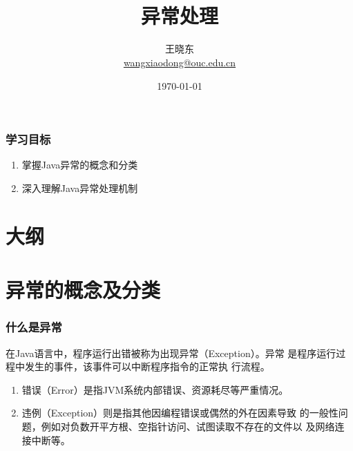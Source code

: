 
\title[KevinW@OUC]{\\  
  异常处理}
\author[王晓东]{王晓东\\
  \href{mailto:wangxiaodong@ouc.edu.cn}{\footnotesize wangxiaodong@ouc.edu.cn}}
\date{\today}


\frame{\titlepage}
\begin{frame}
  \frametitle{学习目标}
  \begin{enumerate}
  \item 掌握Java异常的概念和分类
  \item 深入理解Java异常处理机制
  \end{enumerate}  
\end{frame}

\section*{大纲}


\section{异常的概念及分类}
\begin{frame}[fragile] %
  \frametitle{什么是异常}

  在Java语言中，程序运行出错被称为出现异常（Exception）。异常
  是{\hei\Blue 程序运行过程}中发生的事件，该事件可以中断程序指令的正常执
  行流程。


  \begin{enumerate}[<+-|alert@+>]\kai
  \item {\hei 错误（Error）}是指JVM系统内部错误、资源耗尽等严重情况。
  \item {\hei 违例（Exception）}则是指其他因编程错误或偶然的外在因素导致
    的一般性问题，例如对负数开平方根、空指针访问、试图读取不存在的文件以
    及网络连接中断等。
  \end{enumerate}

   
\end{frame}

